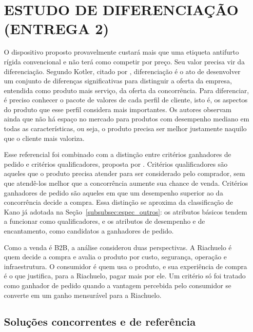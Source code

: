 \section{ESTUDO DE DIFERENCIAÇÃO (ENTREGA 2)}\label{sec:estudo_diferenciacao}

O dispositivo proposto provavelmente custará mais que uma etiqueta antifurto rígida convencional e não terá como competir por preço. Seu valor precisa vir da diferenciação. Segundo Kotler, citado por , diferenciação é o ato de desenvolver um conjunto de diferenças significativas para distinguir a oferta da empresa, entendida como produto mais serviço, da oferta da concorrência. Para diferenciar, é preciso conhecer o pacote de valores de cada perfil de cliente, isto é, os aspectos do produto que esse perfil considera mais importantes. Os autores observam ainda que não há espaço no mercado para produtos com desempenho mediano em todas as características, ou seja, o produto precisa ser melhor justamente naquilo que o cliente mais valoriza.

Esse referencial foi combinado com a distinção entre critérios ganhadores de pedido e critérios qualificadores, proposta por . Critérios qualificadores são aqueles que o produto precisa atender para ser considerado pelo comprador, sem que atendê-los melhor que a concorrência aumente sua chance de venda. Critérios ganhadores de pedido são aqueles em que um desempenho superior ao da concorrência decide a compra. Essa distinção se aproxima da classificação de Kano já adotada na Seção~\ref{subsubsec:espec_outros}: os atributos básicos tendem a funcionar como qualificadores, e os atributos de desempenho e de encantamento, como candidatos a ganhadores de pedido.

Como a venda é B2B, a análise considerou duas perspectivas. A Riachuelo é quem decide a compra e avalia o produto por custo, segurança, operação e infraestrutura. O consumidor é quem usa o produto, e sua experiência de compra é o que justifica, para a Riachuelo, pagar mais por ele. Um critério só foi tratado como ganhador de pedido quando a vantagem percebida pelo consumidor se converte em um ganho mensurável para a Riachuelo.

\subsection{Soluções concorrentes e de referência}
\label{sec:solucoes-concorrentes}


